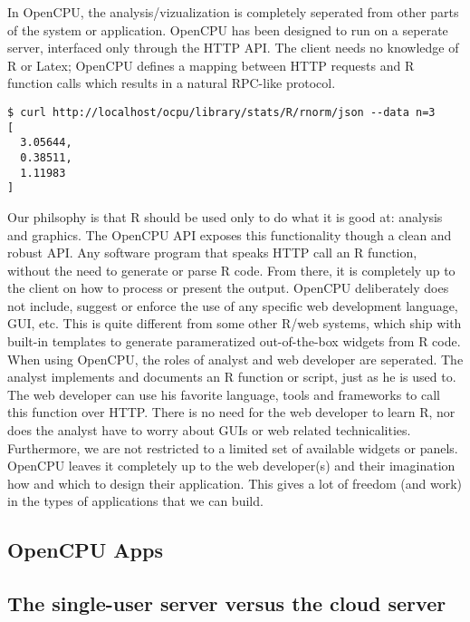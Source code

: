 \documentclass{scrartcl}\usepackage[]{graphicx}\usepackage[]{color}
\begin{document}
In OpenCPU, the analysis/vizualization is completely seperated from other parts of the system or application. OpenCPU has been designed to run on a seperate server, interfaced only through the HTTP API. The client needs no knowledge of R or Latex; OpenCPU defines a mapping between HTTP requests and R function calls which results in a natural RPC-like protocol.  

\begin{verbatim}
$ curl http://localhost/ocpu/library/stats/R/rnorm/json --data n=3
[
  3.05644,
  0.38511,
  1.11983
]
\end{verbatim}

Our philsophy is that R should be used only to do what it is good at: analysis and graphics. The OpenCPU API exposes this functionality though a clean and robust API. Any software program that speaks HTTP call an R function, without the need to generate or parse R code. From there, it is completely up to the client on how to process or present the output. OpenCPU deliberately does not include, suggest or enforce the use of any specific web development language, GUI, etc. This is quite different from some other R/web systems, which ship with built-in templates to generate parameratized out-of-the-box widgets from R code.  \\

When using OpenCPU, the roles of analyst and web developer are seperated. The analyst implements and documents an R function or script, just as he is used to. The web developer can use his favorite language, tools and frameworks to call this function over HTTP. There is no need for the web developer to learn R, nor does the analyst have to worry about GUIs or web related technicalities. Furthermore, we are not restricted to a limited set of available widgets or panels. OpenCPU leaves it completely up to the web developer(s) and their imagination how and which to design their application. This gives a lot of freedom (and work) in the types of applications that we can build.

\subsection{OpenCPU Apps}




\subsection{The single-user server versus the cloud server}
\end{document}

